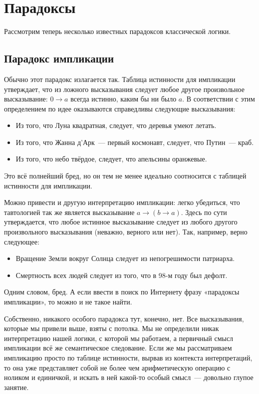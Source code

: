 \section{Парадоксы}

Рассмотрим теперь несколько известных парадоксов классической логики.

\subsection{Парадокс импликации}

Обычно этот парадокс излагается так. Таблица истинности для импликации утверждает, что из ложного высказывания следует любое другое произвольное высказывание: $0 \rightarrow a$ всегда истинно, каким бы ни было $a$. В соответствии с этим определением по идее оказываются справедливы следующие высказывания:

\begin{itemize}
\item Из того, что Луна квадратная, следует, что деревья умеют летать.
\item Из того, что Жанна д’Арк~--- первый космонавт, следует, что Путин~--- краб.
\item Из того, что небо твёрдое, следует, что апельсины оранжевые.
\end{itemize}

Это всё полнейший бред, но он тем не менее идеально соотносится с таблицей истинности для импликации.

Можно привести и другую интерпретацию импликации: легко убедиться, что тавтологией так же является высказывание $a \rightarrow (b \rightarrow a)$. Здесь по сути утверждается, что любое истинное высказывание следует из любого другого произвольного высказывания (неважно, верного или нет). Так, например, верно следующее:

\begin{itemize}
\item Вращение Земли вокруг Солнца следует из непогрешимости патриарха.
\item Смертность всех людей следует из того, что в 98-м году был дефолт.
\end{itemize}

Одним словом, бред. А если ввести в поиск по Интернету фразу «парадоксы импликации», то можно и не такое найти.

Собственно, никакого особого парадокса тут, конечно, нет. Все высказывания, которые мы привели выше, взяты с потолка. Мы не определили никак интерпретацию нашей логики, с которой мы работаем, а первичный смысл импликации всё же семантическое следование. Если же мы рассматриваем импликацию просто по таблице истинности, вырвав из контекста интерпретаций, то она уже представляет собой не более чем арифметическую операцию с ноликом и единичкой, и искать в ней какой-то особый смысл~--- довольно глупое занятие.

